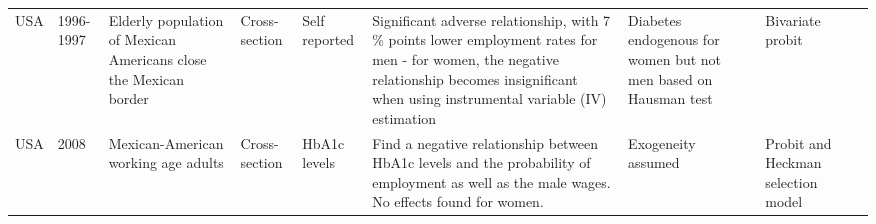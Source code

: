 \documentclass[12pt,english]{article}
\begin{document}
{\begin{landscape}
\begin{tabularx}{\linewidth}{m m m m b b b b m}
			USA       & 1996-1997  & Elderly population of Mexican Americans close the Mexican border & Cross-section           & Self reported                                & Significant adverse relationship, with 7 \% points lower employment rates for men - for women, the negative relationship becomes insignificant when using instrumental variable (IV) estimation                                                                                                                                                                                                                                                                                                                                                                                                                                                                  & Diabetes endogenous for women but not men based on Hausman test                         & Bivariate probit                                                                                                                                                                                                                                                                                     & \textcite{Brown2005}            \\
			USA       & 2008       & Mexican-American working age adults                              & Cross-section           & HbA1c levels                                 & Find a negative  relationship between HbA1c levels and the probability of employment as well as the male wages. No effects found for women.                                                                                                                                                                                                                                                                                                                                                                                                                                                                                                                      & Exogeneity assumed                                                                      & Probit and Heckman selection model                                                                                                                                                                                                                                                                   & \textcite{BrownIII2011}            \\

\end{tabularx}
\end{landscape}}
\end{document}
